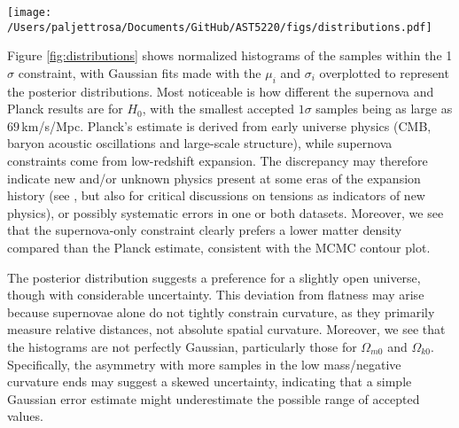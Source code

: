 \documentclass{aa}
\begin{document}

\begin{figure*}
  \centering
  \texttt{[image: /Users/paljettrosa/Documents/GitHub/AST5220/figs/distributions.pdf]}
  \caption{Histograms of the MCMC posterior distributions for the parameters $(H_0,\Omega_{m0}, \Omega_{k0}, \Omega_{\Lambda0})$, compared with Gaussian fits (solid curves) and Planck values. Deviations from Gaussianity indicate asymmetries in parameter uncertainties. \colorbox{Plum}{TODO: maybe change lines}}\label{fig:distributions}
\end{figure*}

Figure \ref{fig:distributions} shows normalized histograms of the samples within the 1$\sigma$ constraint, with Gaussian fits made with the $\mu_i$ and $\sigma_i$ overplotted to represent the posterior distributions. Most noticeable is how different the supernova and Planck results are for $H_0$, with the smallest accepted $1\sigma$ samples being as large as $69\,$km/s/Mpc. Planck's estimate is derived from early universe physics (CMB, baryon acoustic oscillations and large-scale structure), while supernova constraints come from low-redshift expansion. The discrepancy may therefore indicate new and/or unknown physics present at some eras of the expansion history (see \cite{JWST}, but also \cite{tensions} for critical discussions on tensions as indicators of new physics), or possibly systematic errors in one or both datasets. Moreover, we see that the supernova-only constraint clearly prefers a lower matter density compared than the Planck estimate, consistent with the MCMC contour plot.

The posterior distribution suggests a preference for a slightly open universe, though with considerable uncertainty. This deviation from flatness may arise because supernovae alone do not tightly constrain curvature, as they primarily measure relative distances, not absolute spatial curvature. Moreover, we see that the histograms are not perfectly Gaussian, particularly those for $\Omega_{m0}$ and $\Omega_{k0}$. Specifically, the asymmetry with more samples in the low mass/negative curvature ends may suggest a skewed uncertainty, indicating that a simple Gaussian error estimate might underestimate the possible range of accepted values. 
\end{document}
